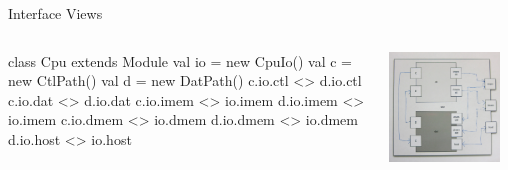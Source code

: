 \documentclass[xcolor=pdflatex,dvipsnames,table]{beamer}
\begin{document}
\begin{frame}[fragile]{Interface Views}
\begin{columns}

\begin{scala}
class Cpu extends Module {
  val io = new CpuIo()
  val c  = new CtlPath()
  val d  = new DatPath()
  c.io.ctl  <> d.io.ctl
  c.io.dat  <> d.io.dat
  c.io.imem <> io.imem
  d.io.imem <> io.imem
  c.io.dmem <> io.dmem
  d.io.dmem <> io.dmem
  d.io.host <> io.host
}
\end{scala}


\begin{center}
\includegraphics[width=0.9\textwidth]{../tutorial/figs/cpu.png} 
\end{center}

\end{columns}
\end{frame}
\end{document}
